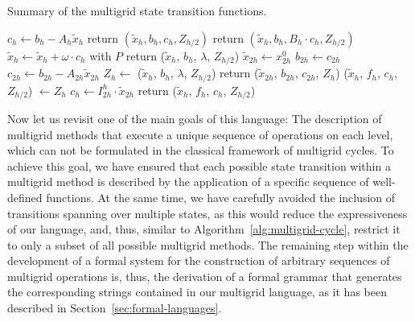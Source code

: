 \begin{table}
	\caption{Summary of the multigrid state transition functions.}
	\label{table:grammar-semantics}
	\begin{algorithmic}
	\State $c_h \gets b_h - A_h \tilde{x}_h$
	\State return $(\tilde{x}_h, b_h, c_h, Z_{h/2})$
	\EndFunction
	\State
	\State return $(\tilde{x}_h, b_h, B_h\cdot c_h, Z_{h/2})$
	\EndFunction
	\State
	\State $\tilde{x}_h \gets \tilde{x}_h + \omega \cdot c_h$ with $P$
	\State return ($\tilde{x}_h$, $b_h$, $\lambda$, $Z_{h/2}$) 
	\EndFunction
	\State
	\State $\tilde{x}_{2h} \gets x_{2h}^0$ 
	\State $b_{2h} \gets c_{2h}$
	\State $c_{2h} \gets b_{2h} - A_{2h} \tilde{x}_{2h}$ 
	\State $Z_h \gets$ ($\tilde{x}_{h}$, $b_{h}$, $\lambda$, $Z_{h/2}$)
	\State return ($\tilde{x}_{2h}$, $b_{2h}$, $c_{2h}$, $Z_h$)
	\EndFunction
	\State
	\State ($\tilde{x}_h$, $f_{h}$, $c_h$, $Z_{h/2}$) $\gets Z_{h}$
	\State $c_h \gets I_{2h}^{h} \cdot \tilde{x}_{2h}$
	\State return ($\tilde{x}_h$, $f_{h}$, $c_h$, $Z_{h/2}$)
	\EndFunction
	\end{algorithmic}
\end{table}

Now let us revisit one of the main goals of this language: The description of multigrid methods that execute a unique sequence of operations on each level, which can not be formulated in the classical framework of multigrid cycles.
To achieve this goal, we have ensured that each possible state transition within a multigrid method is described by the application of a specific sequence of well-defined functions. 
At the same time, we have carefully avoided the inclusion of transitions spanning over multiple states, as this would reduce the expressiveness of our language, and, thus, similar to Algorithm~\ref{alg:multigrid-cycle}, restrict it to only a subset of all possible multigrid methods.
The remaining step within the development of a formal system for the construction of arbitrary sequences of multigrid operations is, thus, the derivation of a formal grammar that generates the corresponding strings contained in our multigrid language, as it has been described in Section~\ref{sec:formal-languages}.

